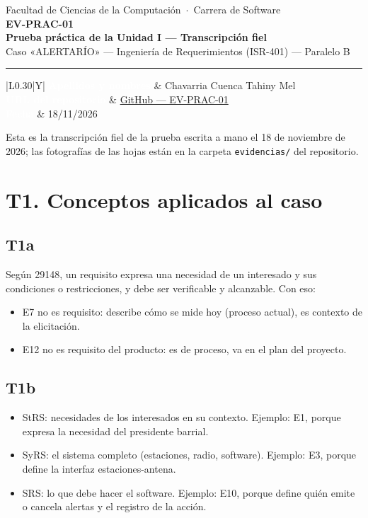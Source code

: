 \documentclass[11pt]{article}
\newcommand{\bhdr}[1]{\cellcolor{midblue}\textcolor{white}{\textbf{#1}}}
\newcommand{\seccion}[1]{\section{\textcolor{utegreendk}{#1}}}
\newcommand{\campo}{}
\begin{document}
\begin{center}
	{\large Facultad de Ciencias de la Computación \,$\cdot$\, Carrera de Software}\\[8pt]
	{\LARGE\textbf{\textcolor{utegreendk}{EV-PRAC-01}}}\\[4pt]
	{\Large\textbf{Prueba práctica de la Unidad I --- Transcripción fiel}}\\[4pt]
	{\large Caso «ALERTARÍO» --- Ingeniería de Requerimientos (ISR-401) --- Paralelo B}
\end{center}
\noindent\textcolor{gold}{\rule{\linewidth}{1.5pt}}

\vspace{4pt}
\noindent\begin{tabularx}{\linewidth}{|L{0.30\linewidth}|Y|}
	\hline
	\bhdr{Apellidos y nombres} & Chavarria Cuenca Tahiny Mel\campo\\ \hline
	\bhdr{URL del repositorio} &
\href{https://github.com/TahinyMel/ISR401-ChavarriaTahiny/tree/main/EV-PRAC-01}{GitHub --- EV-PRAC-01}\\ \hline
	\bhdr{Fecha} & 18/11/2026 \campo\\ \hline
\end{tabularx}

\begin{cajaaviso}[title={Declaración (regla R5)}]
Esta es la transcripción fiel de la prueba escrita a mano el 18 de noviembre de 2026; las fotografías de las hojas están en la carpeta \texttt{evidencias/} del repositorio.
\end{cajaaviso}

\seccion{T1. Conceptos aplicados al caso}

\subsection*{T1a}
Según 29148, un requisito expresa una necesidad de un interesado y sus condiciones o restricciones, y debe ser verificable y alcanzable. Con eso:

\begin{itemize}
    \item E7 no es requisito: describe cómo se mide hoy (proceso actual), es contexto de la elicitación.
    \item E12 no es requisito del producto: es de proceso, va en el plan del proyecto.
\end{itemize}
\campo

\subsection*{T1b}
\begin{itemize}
    \item StRS: necesidades de los interesados en su contexto. Ejemplo: E1, porque expresa la necesidad del presidente barrial.
    \item SyRS: el sistema completo (estaciones, radio, software). Ejemplo: E3, porque define la interfaz estaciones-antena.
    \item SRS: lo que debe hacer el software. Ejemplo: E10, porque define quién emite o cancela alertas y el registro de la acción.
\end{itemize}
\campo
\end{document}
